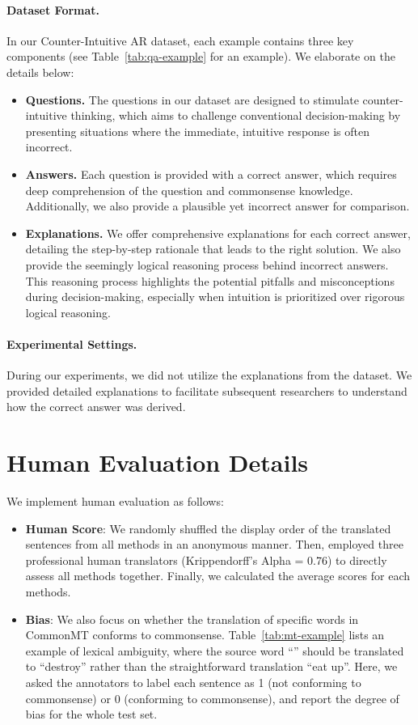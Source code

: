 \paragraph{Dataset Format.}
In our Counter-Intuitive AR dataset, each example contains three key components (see Table~\ref{tab:qa-example} for an example). We elaborate on the details below:
\begin{itemize}[leftmargin=10pt]
    \item \textbf{Questions.} The questions in our dataset are designed to stimulate counter-intuitive thinking, which aims to challenge conventional decision-making by presenting situations where the immediate, intuitive response is often incorrect.  
    \item \textbf{Answers.} Each question is provided with a correct answer, which requires deep comprehension of the question and commonsense knowledge. Additionally, we also provide a plausible yet incorrect answer for comparison. 
    \item \textbf{Explanations.} We offer comprehensive explanations for each correct answer, detailing the step-by-step rationale that leads to the right solution. We also provide the seemingly logical reasoning process behind incorrect answers. This reasoning process highlights the potential pitfalls and misconceptions during decision-making, especially when intuition is prioritized over rigorous logical reasoning. 
    
\end{itemize}

\paragraph{Experimental Settings.}
During our experiments, we did not utilize the explanations from the dataset. We provided detailed explanations to facilitate subsequent researchers to understand how the correct answer was derived.



\section{Human Evaluation Details}
We implement human evaluation as follows:
\begin{itemize}[leftmargin=10pt]
    \item \textbf{Human Score}: We randomly shuffled the display order of the translated sentences from all methods in an anonymous manner. Then, employed three professional human translators (Krippendorff's Alpha = 0.76) to directly assess all methods together. Finally, we calculated the average scores for each methods.
    \item \textbf{Bias}: We also focus on whether the translation of specific words in CommonMT conforms to commonsense. Table~\ref{tab:mt-example} lists an example of lexical ambiguity, where the source word ``'' should be translated to “destroy” rather than the straightforward translation “eat up”. Here, we asked the annotators to label each sentence as 1 (not conforming to commonsense) or 0 (conforming to commonsense), and report the degree of bias for the whole test set.
\end{itemize}


